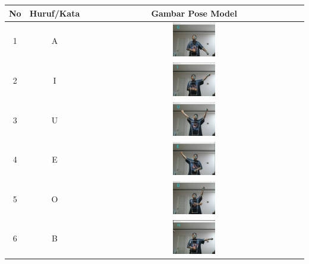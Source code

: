 \begin{table}[!hbt]
	\centering
	\label{tbl:Tabel Contoh Huruf/Kata dan Gambar Pose Model CNN Xception Orang Kedua}
	\begin{tabular}{|c|c|c|}
	\hline
	No & Huruf/Kata & Gambar Pose Model  \\
	\hline
	1 & A & \includegraphics[width=0.2\textwidth]{gambar/bener/HurufA_ModelCNNXception_Fachry.png} \\
	\hline
	2 & I & \includegraphics[width=0.2\textwidth]{gambar/bener/HurufI_ModelCNNXception_Fachry.png} \\
	\hline
	3 & U & \includegraphics[width=0.2\textwidth]{gambar/bener/HurufU_ModelCNNXception_Fachry.png} \\
	\hline
	4 & E & \includegraphics[width=0.2\textwidth]{gambar/bener/HurufE_ModelCNNXception_Fachry.png} \\
	\hline
	5 & O & \includegraphics[width=0.2\textwidth]{gambar/bener/HurufO_ModelXception_Fachry.png} \\
	\hline
	6 & B & \includegraphics[width=0.2\textwidth]{gambar/bener/HurufB_ModelCNNXception_Fachry.png} \\

\end{tabular}
\end{table}
